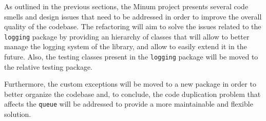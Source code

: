 As outlined in the previous sections, the Minum project presents several code smells and design issues that need to be addressed in order to improve the overall quality of the codebase. The refactoring will aim to solve the issues related to the \texttt{logging} package by providing an hierarchy of classes that will allow to better manage the logging system of the library, and allow to easily extend it in the future. Also, the testing classes present in the \texttt{logging} package will be moved to the relative testing package.

Furthermore, the custom exceptions will be moved to a new package in order to better organize the codebase and, to conclude, the code duplication problem that affects the \texttt{queue} will be addressed to provide a more maintainable and flexible solution.

